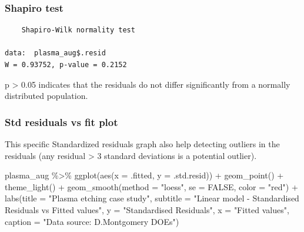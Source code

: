\documentclass[
]{book}
\newenvironment{Shaded}{\begin{snugshade}}{\end{snugshade}}
\newcommand{\AttributeTok}[1]{\textcolor[rgb]{0.77,0.63,0.00}{#1}}
\newcommand{\ConstantTok}[1]{\textcolor[rgb]{0.00,0.00,0.00}{#1}}
\newcommand{\FunctionTok}[1]{\textcolor[rgb]{0.00,0.00,0.00}{#1}}
\newcommand{\NormalTok}[1]{#1}
\newcommand{\SpecialCharTok}[1]{\textcolor[rgb]{0.00,0.00,0.00}{#1}}
\newcommand{\StringTok}[1]{\textcolor[rgb]{0.31,0.60,0.02}{#1}}
\begin{document}
\hypertarget{shapiroTest}{%
\subsubsection{Shapiro test}\label{shapiroTest}}

\begin{Shaded}
\end{Shaded}

\begin{verbatim}
	Shapiro-Wilk normality test

data:  plasma_aug$.resid
W = 0.93752, p-value = 0.2152
\end{verbatim}

p \textgreater{} 0.05 indicates that the residuals do not differ significantly from a normally distributed population.

\hypertarget{std-residuals-vs-fit-plot}{%
\subsubsection{Std residuals vs fit plot}\label{std-residuals-vs-fit-plot}}

This specific Standardized residuals graph also help detecting outliers in the residuals (any residual \textgreater{} 3 standard deviations is a potential outlier).

\begin{Shaded}
\begin{Highlighting}[]
\NormalTok{plasma\_aug }\SpecialCharTok{\%\textgreater{}\%} 
  \FunctionTok{ggplot}\NormalTok{(}\FunctionTok{aes}\NormalTok{(}\AttributeTok{x =}\NormalTok{ .fitted, }\AttributeTok{y =}\NormalTok{ .std.resid)) }\SpecialCharTok{+}
  \FunctionTok{geom\_point}\NormalTok{() }\SpecialCharTok{+}
  \FunctionTok{theme\_light}\NormalTok{() }\SpecialCharTok{+}
  \FunctionTok{geom\_smooth}\NormalTok{(}\AttributeTok{method =} \StringTok{"loess"}\NormalTok{, }\AttributeTok{se =} \ConstantTok{FALSE}\NormalTok{, }\AttributeTok{color =} \StringTok{"red"}\NormalTok{) }\SpecialCharTok{+}
  \FunctionTok{labs}\NormalTok{(}\AttributeTok{title =} \StringTok{"Plasma etching case study"}\NormalTok{,}
       \AttributeTok{subtitle =} \StringTok{"Linear model {-} Standardised Residuals vs Fitted values"}\NormalTok{,}
       \AttributeTok{y =} \StringTok{"Standardised Residuals"}\NormalTok{,}
       \AttributeTok{x =} \StringTok{"Fitted values"}\NormalTok{,}
       \AttributeTok{caption =} \StringTok{"Data source: D.Montgomery DOEs"}\NormalTok{)}
\end{Highlighting}
\end{Shaded}
\end{document}

